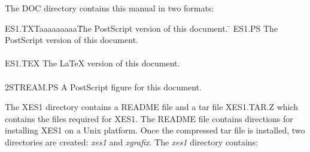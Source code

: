 \begin{section}
\begin{subsection}
\noindent
   The DOC directory contains this manual in two formats:
\begin{tabbing}
        ES1.TXTaaaaaaaaa\=       The PostScript version of this document. \= \kill
        ES1.PS  \>       The PostScript version of this document. \> \\
								\\
        ES1.TEX \>       The LaTeX version of this document. \> \\
								\\
        2STREAM.PS \>       A PostScript figure for this document. \> 
\end{tabbing}

\noindent
   The XES1 directory contains a README file and a tar file XES1.TAR.Z which
   contains the files required for XES1.  The README file contains
   directions for installing XES1 on a Unix platform.  Once the compressed tar
   file is installed, two directories are created: {\em xes1} 
   and {\em xgrafix}.  The {\em xes1} directory contains:


\end{subsection}
\end{section}
